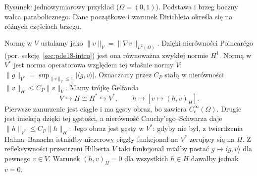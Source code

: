 \begin{center}

\small Rysunek: jednowymiarowy przykład ($\Omega=(0,1)$). Podstawa i brzeg boczny walca parabolicznego.
Dane początkowe i warunek Dirichleta określa się na różnych częściach brzegu.
\end{center}

Normę w $V$ ustalamy jako $\|v\|_V=\|\nabla v\|_{L^2(\Omega)}$.
Dzięki nierówności Poincarégo (por. sekcję~\ref{sec:pde18-intro})
jest ona równoważna zwykłej normie $H^1$.
Normą w $V^*$ jest norma operatorowa względem tej
właśnie normy $V$:
$\|g\|_{V^*}=\sup_{\|v\|_V\le1}|\langle g,v\rangle|$.
Oznaczamy przez
$C_P$ stałą w nierówności $\|v\|_H\le C_P\|v\|_V$.
Mamy trójkę Gelfanda
\[
 V\hookrightarrow H\cong H^*\hookrightarrow V^*,
 \qquad h\longmapsto[v\mapsto(h,v)_H].
\]
Pierwsze zanurzenie jest ciągłe i ma gęsty obraz,
bo zawiera $C_c^\infty(\Omega)$. Drugie jest iniekcją
dzięki tej gęstości, a nierówność Cauchy'ego--Schwarza
daje $\|h\|_{V^*}\le C_P\|h\|_H$.
Jego obraz jest gęsty w $V^*$: gdyby nie był, z twierdzenia
Hahna--Banacha istniałby
niezerowy ciągły funkcjonał na $V^*$ zerujący się na $H$.
Z refleksywności przestrzeni Hilberta $V$ taki funkcjonał
miałby postać $g\mapsto\langle g,v\rangle$ dla pewnego
$v\in V$. Warunek $(h,v)_H=0$ dla wszystkich $h\in H$
dawałby jednak $v=0$.

